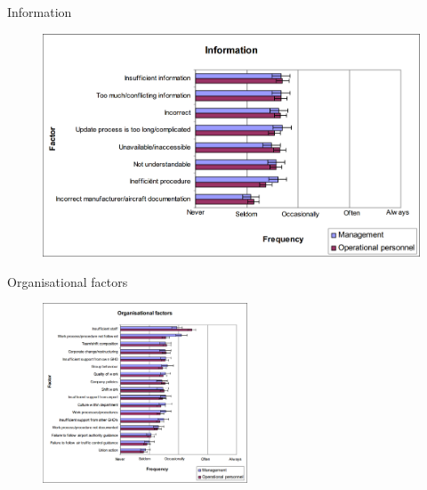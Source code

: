 \begin{frame}{Information}{}
	\begin{figure}[H]
	\centering
	\includegraphics[width=\textwidth]{Grafik/Information}
\end{figure}
\end{frame}

\begin{frame}{Organisational factors}{}
	\begin{figure}[H]
	\centering
	\includegraphics[width=230px]{Grafik/OrganisationalFactors}
\end{figure}
\end{frame}